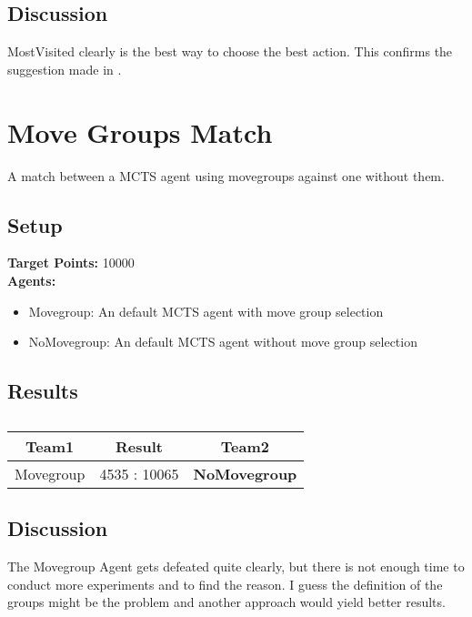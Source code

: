 \subsection*{Discussion}
MostVisited clearly is the best way to choose the best action. This confirms the suggestion made in \cite{ismcts, whitehouse14}.


\section{Move Groups Match}
\label{sec:movegroupsexp}
A match between a MCTS agent using movegroups against one without them.
\subsection*{Setup}
\textbf{Target Points:} 10000\\
\textbf{Agents:}
\begin{itemize}
    \setlength\itemsep{2px}
    \item Movegroup: An default MCTS agent with move group selection
    \item NoMovegroup: An default MCTS agent without move group selection
\end{itemize}

\subsection*{Results}
\begin{table}[h!]
  \centering

  \begin{tabular}{ccc}
    \textbf{Team1} & \textbf{Result}  & \textbf{Team2}\\
    \hline
    Movegroup &  4535 : 10065  & \textbf{NoMovegroup}\\
    \hline
  \end{tabular}
  \caption[Result of the Move Group Match]{}
\end{table}

\subsection*{Discussion}
The Movegroup Agent gets defeated quite clearly, but there is not enough time to conduct more experiments and to find the reason.
I guess the definition of the groups might be the problem and another approach would yield better results.

